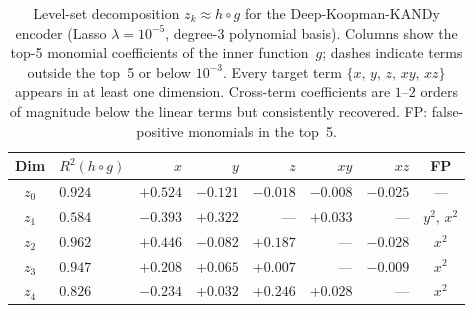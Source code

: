 \documentclass{article}
\begin{document}
\begin{table}[ht]
    \centering
    \begin{tabular}{@{}clrrrrrc@{}}
    \toprule
    Dim & $R^2(h \circ g)$ & $x$ & $y$ & $z$ & $xy$ & $xz$ & FP \\
    \midrule
    $z_0$ & $0.924$ & $+0.524$ & $-0.121$ & $-0.018$ & $-0.008$ & $-0.025$ & --- \\
    $z_1$ & $0.584$ & $-0.393$ & $+0.322$ & --- & $+0.033$ & --- & $y^2,\, x^2$ \\
    $z_2$ & $0.962$ & $+0.446$ & $-0.082$ & $+0.187$ & --- & $-0.028$ & $x^2$ \\
    $z_3$ & $0.947$ & $+0.208$ & $+0.065$ & $+0.007$ & --- & $-0.009$ & $x^2$ \\
    $z_4$ & $0.826$ & $-0.234$ & $+0.032$ & $+0.246$ & $+0.028$ & --- & $x^2$ \\
    \bottomrule
    \end{tabular}
    \caption{Level-set decomposition $z_k \approx h \circ g$ for the
    Deep-Koopman-KANDy encoder (Lasso $\lambda = 10^{-5}$, degree-3
    polynomial basis). Columns show the top-5 monomial coefficients of the
    inner function~$g$; dashes indicate terms outside the top~5 or below
    $10^{-3}$. Every target term $\{x,\,y,\,z,\,xy,\,xz\}$ appears in at least one
    dimension. Cross-term coefficients are $1$--$2$ orders of magnitude below
    the linear terms but consistently recovered. FP: false-positive monomials
    in the top~5.}
    \label{tab:levelset-decomposition}
\end{table}


\clearpage
\end{document}
